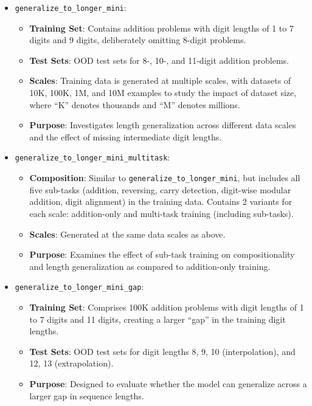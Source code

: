 \begin{itemize}
    \item \texttt{generalize\_to\_longer\_mini}:
          \begin{itemize}
              \item \textbf{Training Set}: Contains addition problems with digit lengths of 1 to 7 digits and 9 digits, deliberately omitting 8-digit problems.
              \item \textbf{Test Sets}: OOD test sets for 8-, 10-, and 11-digit addition problems.
              \item \textbf{Scales}: Training data is generated at multiple scales, with datasets of 10K, 100K, 1M, and 10M examples to study the impact of dataset size, where ``K'' denotes thousands and ``M'' denotes millions.
              \item \textbf{Purpose}: Investigates length generalization across different data scales and the effect of missing intermediate digit lengths.
          \end{itemize}

    \item \texttt{generalize\_to\_longer\_mini\_multitask}:
          \begin{itemize}
              \item \textbf{Composition}: Similar to \texttt{generalize\_to\_longer\_mini}, but includes all five sub-tasks (addition, reversing, carry detection, digit-wise modular addition, digit alignment) in the training data. Contains 2 variants for each scale: addition-only and multi-task training (including sub-tasks).
              \item \textbf{Scales}: Generated at the same data scales as above.
              \item \textbf{Purpose}: Examines the effect of sub-task training on compositionality and length generalization as compared to addition-only training.
          \end{itemize}

    \item \texttt{generalize\_to\_longer\_mini\_gap}:
          \begin{itemize}
              \item \textbf{Training Set}: Comprises 100K addition problems with digit lengths of 1 to 7 digits and 11 digits, creating a larger ``gap'' in the training digit lengths.
              \item \textbf{Test Sets}: OOD test sets for digit lengths 8, 9, 10 (interpolation), and 12, 13 (extrapolation).
              \item \textbf{Purpose}: Designed to evaluate whether the model can generalize across a larger gap in sequence lengths.
          \end{itemize}
\end{itemize}

